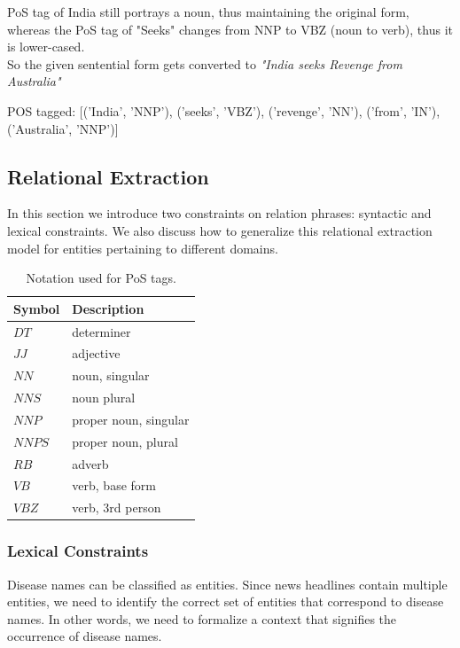 \documentclass{article}
\begin{document}
PoS tag of India still portrays a noun, thus maintaining the original form, whereas the PoS tag of "Seeks" changes from NNP to VBZ (noun to verb), thus it is lower-cased.\\

So the given sentential form gets converted to \textit{"India seeks Revenge from Australia"}

POS tagged: [('India', 'NNP'), ('seeks', 'VBZ'), ('revenge', 'NN'), ('from', 'IN'), ('Australia', 'NNP')]


\subsection{Relational Extraction}

In this section we introduce two constraints on relation phrases: syntactic and lexical constraints. We also discuss how to generalize this relational extraction model for entities pertaining to different domains. 

\begin{table}[h]
  \caption{Notation used for PoS tags.}
  \centering
  \begin{tabular}{|l|l|} \hline
  \label{tab:pos-notation}
  \textbf{Symbol} & \textbf{Description} \\ \hline
  $DT$   & determiner\\ \hline
  $JJ$   & adjective\\ \hline
  $NN$   & noun, singular  \\ \hline
  $NNS$   & noun plural    \\ \hline
  $NNP$   & proper noun, singular      \\ \hline
  $NNPS$   & proper noun, plural	 \\ \hline
  $RB$   & adverb    \\ \hline
  $VB$   & verb, base form    \\ \hline
  $VBZ$   & verb, 3rd person\\ \hline
  
  \end{tabular}
\end{table}

\subsubsection{Lexical Constraints}

Disease names can be classified as entities. Since news headlines contain multiple entities, we need to identify the correct set of entities that correspond to disease names. In other words, we need to formalize a context that signifies the occurrence of disease names. 
\end{document}
